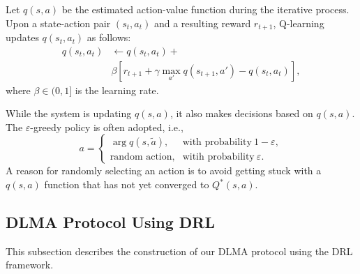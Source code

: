 \documentclass[journal,comsoc]{IEEEtran}
\begin{document}
Let $ q\left( s, a\right)  $ be the estimated action-value function during the iterative process. Upon a state-action pair $({s_t},{a_t})$ and a resulting reward $ r_{t+1} $, Q-learning updates $q({s_t},{a_t})$ as follows:
\begin{align}\label{Qupdate}
q\left( {{s_t},{a_t}} \right) &\leftarrow q\left( {{s_t},{a_t}} \right) +\nonumber \\
&\beta \left[ {{r_{t + 1}} + \gamma \mathop {\max }\limits_{a'} q\left( {{s_{t + 1}},a'} \right) - q\left( {{s_t},{a_t}} \right)} \right],
\end{align}
where $ \beta  \in (0,1] $ is the learning rate.

While the system is updating $ q\left( {s,a} \right) $, it also makes decisions based on  $ q\left( {s,a} \right) $. The $ \varepsilon $-greedy policy is often adopted, i.e.,  
\begin{equation}
{a} = \left\{ {\begin{array}{*{20}{c}}
	{\mathop {\arg \max_{\tilde a} } q\left( {{s},{\tilde a}} \right),}&{\text{with probability} \ 1-\varepsilon},\\
	{\text{random action},}&{\text{witih probability} \ \varepsilon}.
	\end{array}} \right.
\end{equation}
A reason for randomly selecting an action is to avoid getting stuck with a $ q\left( {s,a} \right) $ function that has not yet converged to $ {Q^ * }\left( {s,a} \right) $. 
\subsection{DLMA Protocol Using DRL}\label{DLMA_formulation}
This subsection describes the construction of our DLMA protocol using the DRL framework. 
\end{document}
